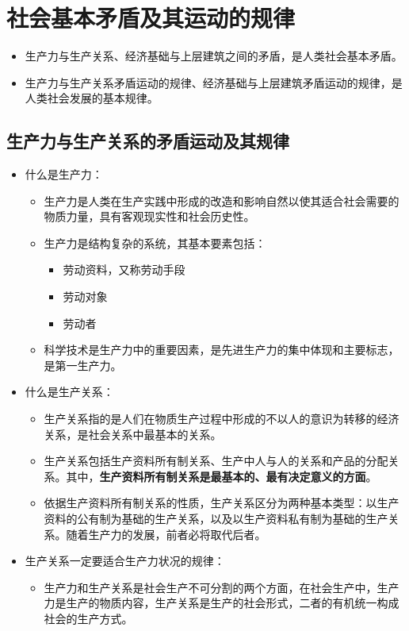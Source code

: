 \documentclass[12pt,openany]{ctexbook}
\begin{document}
\section{社会基本矛盾及其运动的规律}
\begin{itemize}
  \item 生产力与生产关系、经济基础与上层建筑之间的矛盾，是人类社会基本矛盾。
  \item 生产力与生产关系矛盾运动的规律、经济基础与上层建筑矛盾运动的规律，是人类社会发展的基本规律。
\end{itemize}
\subsection{生产力与生产关系的矛盾运动及其规律}
\begin{itemize}
  \item 什么是生产力：
\begin{itemize}
  \item 生产力是人类在生产实践中形成的改造和影响自然以使其适合社会需要的物质力量，具有客观现实性和社会历史性。
  \item 生产力是结构复杂的系统，其基本要素包括：
\begin{itemize}
  \item 劳动资料，又称劳动手段
  \item 劳动对象
  \item 劳动者
\end{itemize}
  \item 科学技术是生产力中的重要因素，是先进生产力的集中体现和主要标志，是第一生产力。
\end{itemize}
  \item 什么是生产关系：
\begin{itemize}
  \item 生产关系指的是人们在物质生产过程中形成的不以人的意识为转移的经济关系，是社会关系中最基本的关系。
  \item 生产关系包括生产资料所有制关系、生产中人与人的关系和产品的分配关系。其中，\textbf{生产资料所有制关系是最基本的、最有决定意义的方面}。
  \item 依据生产资料所有制关系的性质，生产关系区分为两种基本类型：以生产资料的公有制为基础的生产关系，以及以生产资料私有制为基础的生产关系。随着生产力的发展，前者必将取代后者。
\end{itemize}
  \item 生产关系一定要适合生产力状况的规律：
\begin{itemize}
  \item 生产力和生产关系是社会生产不可分割的两个方面，在社会生产中，生产力是生产的物质内容，生产关系是生产的社会形式，二者的有机统一构成社会的生产方式。

\end{itemize}
\end{itemize}
\end{document}
